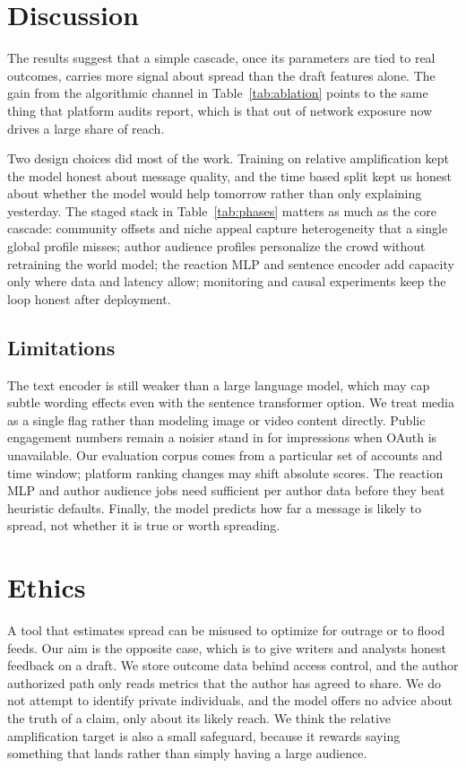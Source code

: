 \documentclass[11pt]{article}
\begin{document}
\section{Discussion}

The results suggest that a simple cascade, once its parameters are tied to real
outcomes, carries more signal about spread than the draft features alone. The
gain from the algorithmic channel in Table~\ref{tab:ablation} points to the same
thing that platform audits report, which is that out of network exposure now
drives a large share of reach.

Two design choices did most of the work. Training on relative amplification kept
the model honest about message quality, and the time based split kept us honest
about whether the model would help tomorrow rather than only explaining
yesterday. The staged stack in Table~\ref{tab:phases} matters as much as the
core cascade: community offsets and niche appeal capture heterogeneity that a
single global profile misses; author audience profiles personalize the crowd
without retraining the world model; the reaction MLP and sentence encoder add
capacity only where data and latency allow; monitoring and causal experiments
keep the loop honest after deployment.

\subsection{Limitations}
The text encoder is still weaker than a large language model, which may cap
subtle wording effects even with the sentence transformer option. We treat media
as a single flag rather than modeling image or video content directly. Public
engagement numbers remain a noisier stand in for impressions when OAuth is
unavailable. Our evaluation corpus comes from a particular set of accounts and
time window; platform ranking changes may shift absolute scores. The reaction
MLP and author audience jobs need sufficient per author data before they beat
heuristic defaults. Finally, the model predicts how far a message is likely to
spread, not whether it is true or worth spreading.

\section{Ethics}

A tool that estimates spread can be misused to optimize for outrage or to flood
feeds. Our aim is the opposite case, which is to give writers and analysts honest
feedback on a draft. We store outcome data behind access control, and the author
authorized path only reads metrics that the author has agreed to share. We do not
attempt to identify private individuals, and the model offers no advice about the
truth of a claim, only about its likely reach. We think the relative amplification
target is also a small safeguard, because it rewards saying something that lands
rather than simply having a large audience.
\end{document}

